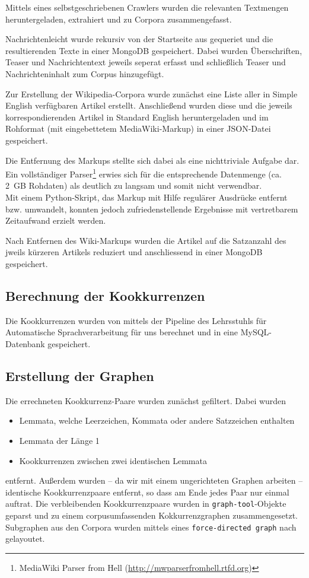 \documentclass[11pt, a4paper]{article}
\begin{document}
Mittels eines selbstgeschriebenen Crawlers wurden die relevanten Textmengen
heruntergeladen, extrahiert und zu Corpora zusammengefasst.

Nachrichtenleicht wurde rekursiv von der Startseite aus gequeriet
und die resultierenden Texte in einer MongoDB gespeichert.
Dabei wurden Überschriften, Teaser und Nachrichtentext jeweils seperat erfasst
und schließlich Teaser und Nachrichteninhalt zum Corpus hinzugefügt.

Zur Erstellung der Wikipedia-Corpora wurde zunächst eine Liste aller
in Simple English verfügbaren Artikel erstellt. Anschließend wurden diese und
die jeweils korrespondierenden Artikel in Standard English heruntergeladen und
im Rohformat (mit eingebettetem MediaWiki-Markup) in einer JSON-Datei gespeichert.

Die Entfernung des Markups stellte sich dabei als eine nichttriviale Aufgabe dar.
Ein vollständiger Parser\footnote{MediaWiki
Parser from Hell (\url{http://mwparserfromhell.rtfd.org})} erwies sich für die
entsprechende Datenmenge (ca. 2~GB Rohdaten) als deutlich zu langsam
und somit nicht verwendbar.
\\
Mit einem Python-Skript, das Markup mit Hilfe regul\"arer Ausdr\"ucke entfernt
bzw. umwandelt, konnten jedoch zufriedenstellende Ergebnisse mit vertretbarem
Zeitaufwand erzielt werden.

Nach Entfernen des Wiki-Markups wurden die Artikel auf die Satzanzahl
des jweils k\"urzeren Artikels reduziert und anschliessend in einer MongoDB
gespeichert.


\subsection{Berechnung der Kookkurrenzen}

Die Kookkurrenzen wurden von mittels der Pipeline des Lehrsstuhls f\"ur
Automatische Sprachverarbeitung für uns berechnet und in eine MySQL-Datenbank
gespeichert.


\subsection{Erstellung der Graphen}

Die errechneten Kookkurrenz-Paare wurden zunächst gefiltert. Dabei wurden 
\begin{itemize}
    \item Lemmata, welche Leerzeichen, Kommata oder andere Satzzeichen enthalten
    \item Lemmata der Länge 1
    \item Kookkurrenzen zwischen zwei identischen Lemmata
\end{itemize}
entfernt.
Außerdem wurden -- da wir mit einem ungerichteten Graphen arbeiten -- identische
Kookkurrenzpaare entfernt, so dass am Ende jedes Paar nur einmal auftrat.
Die verbleibenden Kookkurrenzpaare wurden in \texttt{graph-tool}-Objekte geparst
und zu einem corpusumfassenden Kokkurrenzgraphen zusammengesetzt.
Subgraphen aus den Corpora wurden mittels eines \texttt{force-directed graph}
nach \cite{Hu2006} gelayoutet.
\end{document}
